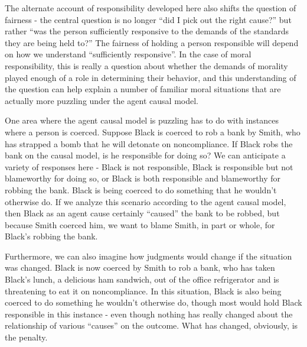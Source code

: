 \documentclass[phd,12pt,oneside,paper=letterpaper]{ubcthesis}
\begin{document}
The alternate account of responsibility developed here also shifts the question of fairness - the central question is no longer ``did I pick out the right cause?'' but rather ``was the person sufficiently responsive to the demands of the standards they are being held to?'' The fairness of holding a person responsible will depend on how we understand ``sufficiently responsive''. In the case of moral responsibility, this is really a question about whether the demands of morality played enough of a role in determining their behavior, and this understanding of the question can help explain a number of familiar moral situations that are actually more puzzling under the agent causal model.

One area where the agent causal model is puzzling has to do with instances where a person is coerced.  Suppose Black is coerced to rob a bank by Smith, who has strapped a bomb that he will detonate on noncompliance. If Black robs the bank on the causal model, is he responsible for doing so? We can anticipate a variety of responses here - Black is not responsible, Black is responsible but not blameworthy for doing so, or Black is both responsible and blameworthy for robbing the bank. Black is being coerced to do something that he wouldn't otherwise do. If we analyze this scenario according to the agent causal model, then Black as an agent cause certainly ``caused'' the bank to be robbed, but because Smith coerced him, we want to blame Smith, in part or whole, for Black's robbing the bank. 

Furthermore, we can also imagine how judgments would change if the situation was changed. Black is now coerced by Smith to rob a bank, who has taken Black's lunch, a delicious ham sandwich, out of the office refrigerator and is threatening to eat it on noncompliance. In this situation, Black is also being coerced to do something he wouldn't otherwise do, though most would hold Black responsible in this instance - even though nothing has really changed about the relationship of various ``causes'' on the outcome. What has changed, obviously, is the penalty.
\end{document}
